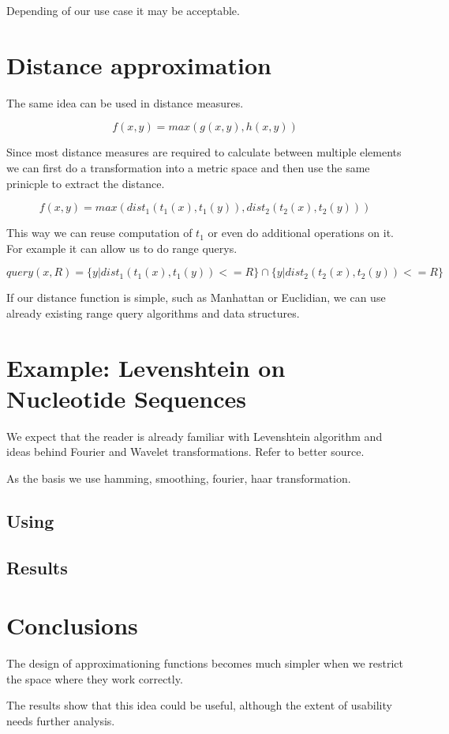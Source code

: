 \documentclass [12pt]{article} %
\begin{document}
Depending of our use case it may be acceptable.

\section{Distance approximation}

The same idea can be used in distance measures.

$$
  f(x,y) = max(g(x,y), h(x,y))
$$

Since most distance measures are required to calculate between multiple
elements we can first do a transformation into a metric space and then
use the same prinicple to extract the distance.

$$
  f(x,y) = max( dist_1(t_1(x), t_1(y)), dist_2(t_2(x), t_2(y)) )
$$

This way we can reuse computation of $t_1$ or even do additional operations on it.
For example it can allow us to do range querys.

$$
  query(x,R) = \{ y | dist_1(t_1(x), t_1(y)) <= R \} \cap \{ y | dist_2(t_2(x), t_2(y)) <= R \}
$$

If our distance function is simple, such as Manhattan or Euclidian, we can 
use already existing range query algorithms and data structures.

\section{Example: Levenshtein on Nucleotide Sequences}

We expect that the reader is already familiar with Levenshtein algorithm and
ideas behind Fourier and Wavelet transformations. Refer to better source.

As the basis we use hamming, smoothing, fourier, haar transformation. 

\subsection{Using}

\subsection{Results}

\section{Conclusions}

The design of approximationing functions becomes much simpler when we restrict the
space where they work correctly.

The results show that this idea could be useful, although the extent of usability
needs further analysis.

\nocite{*}


\end{document}
